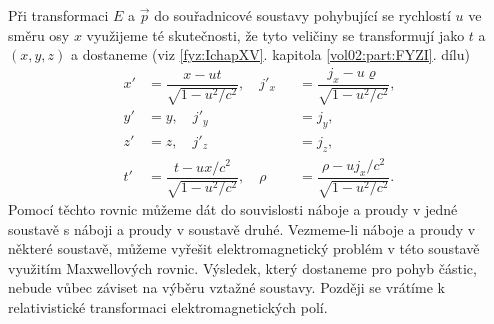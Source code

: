     Při transformaci \(E\) a \(\vec{p}\) do souřadnicové soustavy pohybující se rychlostí \(u\) ve
    směru osy \(x\) využijeme té skutečnosti, že tyto veličiny se transformují jako \(t\) a \((x, y,
    z)\) a dostaneme (viz \ref{fyz:IchapXV}. kapitola \ref{vol02:part:FYZI}. dílu)
    \begin{subequations}\label{fyz:eq824}
      \begin{alignat}{2}
        x'&=\dfrac{x -ut}{\sqrt{1−u^2/c^2}},\hspace{1em} 
        j'_x&&=\dfrac{j_x-u\varrho}{\sqrt{1−u^2/c^2}},               \label{fyz:eq824a}  \\
        y'&=y,\hspace{1em}   j'_y&&=j_y,                              \label{fyz:eq824b}  \\
        z'&=z,\hspace{1em}   j'_z&&=j_z,                              \label{fyz:eq824c}  \\
        t'&=\dfrac{t -ux/c^2}{\sqrt{1−u^2/c^2}},\hspace{1em}     
        ρ&&=\dfrac{ρ-uj_x/c^2}{\sqrt{1−u^2/c^2}}.                    \label{fyz:eq824d}    
      \end{alignat}
    \end{subequations}
    Pomocí těchto rovnic můžeme dát do souvislosti náboje a proudy v jedné soustavě s náboji a
    proudy v soustavě druhé. Vezmeme-li náboje a proudy v některé soustavě, můžeme vyřešit
    elektromagnetický problém v této soustavě využitím Maxwellových rovnic. Výsledek, který
    dostaneme pro pohyb částic, nebude vůbec záviset na výběru vztažné soustavy. Později se vrátíme
    k relativistické transformaci elektromagnetických polí.

